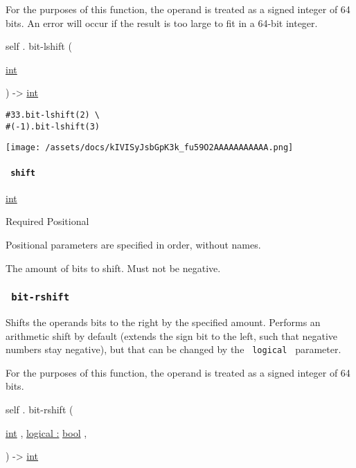For the purposes of this function, the operand is treated as a signed
integer of 64 bits. An error will occur if the result is too large to
fit in a 64-bit integer.

self { . } { bit-lshift } (

{ \href{/docs/reference/foundations/int/}{int} }

) -\textgreater{} \href{/docs/reference/foundations/int/}{int}

\begin{verbatim}
#33.bit-lshift(2) \
#(-1).bit-lshift(3)
\end{verbatim}

\texttt{[image: /assets/docs/kIVISyJsbGpK3k\_fu59O2AAAAAAAAAAA.png]}

\paragraph{\texorpdfstring{\texttt{\ shift\ }}{ shift }}\label{definitions-bit-lshift-shift}

\href{/docs/reference/foundations/int/}{int}

{Required} {{ Positional }}

\label{definitions-bit-lshift-shift-positional-tooltip}
Positional parameters are specified in order, without names.

The amount of bits to shift. Must not be negative.

\subsubsection{\texorpdfstring{\texttt{\ bit-rshift\ }}{ bit-rshift }}\label{definitions-bit-rshift}

Shifts the operand\textquotesingle s bits to the right by the specified
amount. Performs an arithmetic shift by default (extends the sign bit to
the left, such that negative numbers stay negative), but that can be
changed by the \texttt{\ logical\ } parameter.

For the purposes of this function, the operand is treated as a signed
integer of 64 bits.

self { . } { bit-rshift } (

{ \href{/docs/reference/foundations/int/}{int} , } {
\hyperref[definitions-bit-rshift-parameters-logical]{logical :}
\href{/docs/reference/foundations/bool/}{bool} , }

) -\textgreater{} \href{/docs/reference/foundations/int/}{int}

